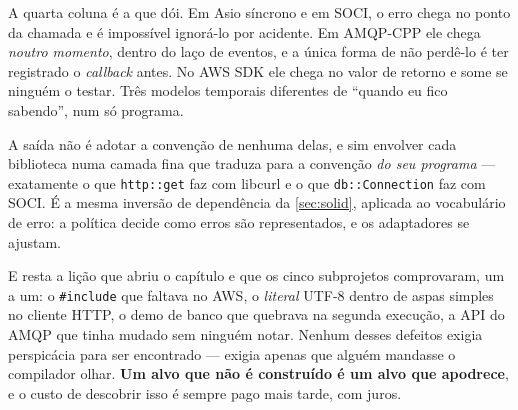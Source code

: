 A quarta coluna é a que dói. Em Asio síncrono e em SOCI, o erro chega no ponto
da chamada e é impossível ignorá-lo por acidente. Em AMQP-CPP ele chega
\emph{noutro momento}, dentro do laço de eventos, e a única forma de não
perdê-lo é ter registrado o \emph{callback} antes. No AWS SDK ele chega no
valor de retorno e some se ninguém o testar. Três modelos temporais diferentes
de ``quando eu fico sabendo'', num só programa.

\begin{regra}
A saída não é adotar a convenção de nenhuma delas, e sim envolver cada
biblioteca numa camada fina que traduza para a convenção \emph{do seu programa}
--- exatamente o que \texttt{http::get} faz com libcurl e o que
\texttt{db::Connection} faz com SOCI. É a mesma inversão de dependência da
\cref{sec:solid}, aplicada ao vocabulário de erro: a política decide como erros
são representados, e os adaptadores se ajustam.
\end{regra}

E resta a lição que abriu o capítulo e que os cinco subprojetos comprovaram, um
a um: o \texttt{\#include} que faltava no AWS, o \emph{literal} UTF-8 dentro de
aspas simples no cliente HTTP, o demo de banco que quebrava na segunda
execução, a API do AMQP que tinha mudado sem ninguém notar. Nenhum desses
defeitos exigia perspicácia para ser encontrado --- exigia apenas que alguém
mandasse o compilador olhar. \textbf{Um alvo que não é construído é um alvo que
apodrece}, e o custo de descobrir isso é sempre pago mais tarde, com juros.

